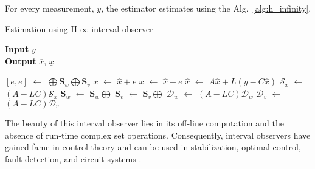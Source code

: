 For every measurement, $y$, the estimator estimates using the Alg.~\ref{alg:h_infinity}.
\begin{algorithm}
		
        \caption{Estimation using H-$\infty$ interval observer}
        \textbf{Input} $y$\\
 		\textbf{Output} $\overline{x}$, $\underline{x}$
        \begin{algorithmic}[1]
        \State $[\overline{e}, \underline{e}]$ $\gets$ $\bigoplus \textbf{S}_w \bigoplus \textbf{S}_v$ \label{alg:main_constraints}
        \State $\overline{x}$ $\gets$ $\hat{x} + \overline{e}$
        \State $\underline{x}$ $\gets$ $\hat{x} + \underline{e}$
        \State $\hat{x}$ $\gets$ $A\hat{x} + L(y- C\hat{x})$ \label{alg:main_reac}
        \State $\mathcal{S}_x$ $\gets$ $(A-LC)\mathcal{S}_x$
        \State $\textbf{S}_w$ $\gets$ $\textbf{S}_w \bigoplus$ 
        \State $\textbf{S}_v$ $\gets$ $\textbf{S}_v \bigoplus$ 
        \State $\mathcal{D}_w$ $\gets$ $(A-LC)\mathcal{D}_w$
        \State $\mathcal{D}_v$ $\gets$ $(A-LC)\mathcal{D}_v$
        \end{algorithmic}
        \label{alg:h_infinity}
\end{algorithm}

The beauty of this interval observer lies in its off-line computation and the absence of run-time complex set operations. Consequently, interval observers have gained fame in control theory and can be used in stabilization, optimal control, fault detection, and circuit systems \cite{Huang2019}.



